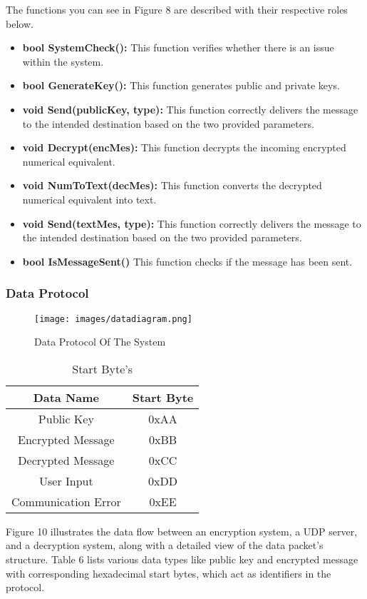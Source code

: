 \documentclass[12pt]{article}
\begin{document}
	The functions you can see in Figure 8  are described with their respective roles below.
	\begin{itemize}
		\item \textbf{bool SystemCheck():}  This function verifies whether there is an issue within the system.
		\item \textbf{bool GenerateKey():} This function generates public and private keys.
		\item \textbf{void Send(publicKey, type):} 	This function correctly delivers the message to the intended destination based on the two provided parameters.
		\item \textbf{void Decrypt(encMes):} This function decrypts the incoming encrypted numerical equivalent.
		\item \textbf{void NumToText(decMes):} This function converts the decrypted numerical equivalent into text.
		\item \textbf{void Send(textMes, type):} This function correctly delivers the message to the intended destination based on the two provided parameters.
		\item \textbf {bool IsMessageSent()} This function checks if the message has been sent.
	\end{itemize}
	\newpage
	\subsubsection{Data Protocol}
	\begin{figure}[H]
		\centering
		\label{}
		\texttt{[image: images/datadiagram.png]}\\[0.5 cm]	
		\caption{Data Protocol Of The System} 		
	\end{figure}
	\begin{table}[H]	
		\centering
		\begin{tabular}{|c|c|}
			\hline
			Data Name & Start Byte  \\
			\hline
			Public Key &  0xAA \\ \hline
			Encrypted Message &  0xBB \\ \hline
			Decrypted Message &  0xCC  \\ \hline
			User Input & 0xDD  \\ \hline
			Communication Error &  0xEE \\ \hline
		\end{tabular}
		\caption{Start Byte's} 
	\end{table}
	Figure 10 illustrates the data flow between an encryption system, a UDP server, and a decryption system, along with a detailed view of the data packet's structure. Table 6 lists various data types like public key and encrypted message with corresponding hexadecimal start bytes, which act as identifiers in the protocol.
	\newpage
\end{document}
